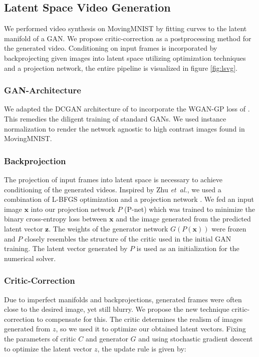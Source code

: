 \documentclass[10pt,twocolumn,letterpaper]{article}
\begin{document}
\subsection{Latent Space Video Generation}

We performed video synthesis on MovingMNIST by fitting curves to the latent manifold of a GAN. We propose critic-correction as a postprocessing method for the generated video. Conditioning on input frames is incorporated by backprojecting given images into latent space utilizing optimization techniques and a projection network, the entire pipeline is visualized in figure \ref{fig:lsvg}.

\subsubsection{GAN-Architecture} 
We adapted the DCGAN architecture of \cite{DCGAN} to incorporate the WGAN-GP loss of \cite{Gulrajani2017}. This remedies the diligent training of standard GANs. We used instance normalization \cite{INST} to render the network agnostic to high contrast images found in MovingMNIST. 

\subsubsection{Backprojection}
The projection of input frames into latent space is necessary to achieve conditioning of the generated videos. Inspired by Zhu {\em et\ al.}, we used a combination of L-BFGS optimization and a projection network \cite{Zhu2016}. We fed an input image $\mathbf{x}$ into our projection network $P$ (P-net) which was trained to minimize the binary cross-entropy loss between $\mathbf{x}$ and the image generated from the predicted latent vector $\mathbf{z}$. The weights of the generator network $G(P(\mathbf{x}))$ were frozen and $P$ closely resembles the structure of the critic used in the initial GAN training. The latent vector generated by $P$ is used as an initialization for the numerical solver. 

\subsubsection{Critic-Correction}
Due to imperfect manifolds and backprojections, generated frames were often close to the desired image, yet still blurry. We propose the new technique critic-correction to compensate for this. The critic determines the realism of images generated from $z$, so we used it to optimize our obtained latent vectors. Fixing the parameters of critic $C$ and generator $G$ and using stochastic gradient descent to optimize the latent vector $z$, the update rule is given by:
\end{document}
